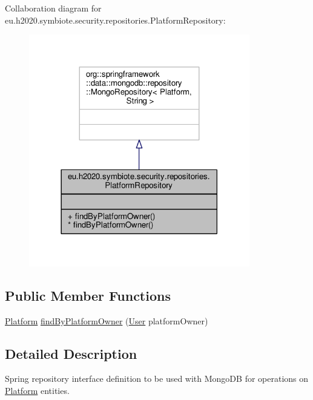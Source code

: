 Collaboration diagram for eu.\+h2020.\+symbiote.\+security.\+repositories.\+Platform\+Repository\+:
\nopagebreak
\begin{figure}[H]
\begin{center}
\leavevmode
\includegraphics[width=273pt]{interfaceeu_1_1h2020_1_1symbiote_1_1security_1_1repositories_1_1PlatformRepository__coll__graph}
\end{center}
\end{figure}
\subsection*{Public Member Functions}
{\bf }\par
\begin{DoxyCompactItemize}
\item 
\hyperlink{classeu_1_1h2020_1_1symbiote_1_1security_1_1commons_1_1Platform}{Platform} \hyperlink{interfaceeu_1_1h2020_1_1symbiote_1_1security_1_1repositories_1_1PlatformRepository_ae228958e2a7305371e5fca9fd8f9f042}{find\+By\+Platform\+Owner} (\hyperlink{classeu_1_1h2020_1_1symbiote_1_1security_1_1commons_1_1User}{User} platform\+Owner)
\end{DoxyCompactItemize}



\subsection{Detailed Description}
Spring repository interface definition to be used with Mongo\+DB for operations on \hyperlink{}{Platform} entities.

